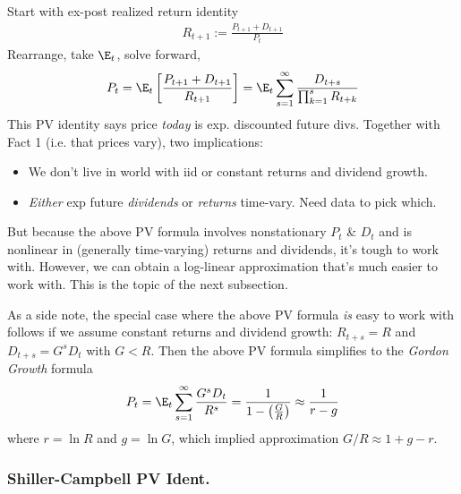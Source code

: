 \documentclass[12pt]{article}
\theoremstyle{plain}
\theoremstyle{definition}
\theoremstyle{remark}
\begin{document}
\begin{multicols*}{2}
Start with ex-post realized return identity
\begin{align}
  R_{t+1}
  :=
  \frac{P_{t+1}+D_{t+1}}{P_t}
  \label{expostrealizedreturns}
\end{align}
Rearrange, take $\E_t$, solve forward,
\begin{align*}
  P_{t}
  = \E_t\left[\frac{P_{t+1}+D_{t+1}}{R_{t+1}}\right]
  =
  \E_t\sum_{s=1}^\infty
  \frac{D_{t+s}}{\prod_{k=1}^s R_{t+k}}
\end{align*}
This PV identity says price \emph{today} is exp. discounted future divs.
Together with Fact 1 (i.e. that prices vary), two implications:
\begin{itemize}
  \item We don't live in world with iid or constant returns and dividend
    growth.
  \item
    \emph{Either} exp future \emph{dividends} or \emph{returns}
    time-vary. Need data to pick which.
\end{itemize}
But because the above PV formula involves nonstationary $P_t$ \& $D_t$
and is nonlinear in (generally time-varying) returns and dividends, it's
tough to work with. However, we can obtain a log-linear approximation
that's much easier to work with. This is the topic of the next
subsection.

As a side note, the special case where the above PV formula \emph{is}
easy to work with follows if we assume constant returns and dividend
growth: $R_{t+s}=R$ and $D_{t+s}=G^sD_t$ with $G<R$. Then the above PV
formula simplifies to the \emph{Gordon Growth} formula
\begin{align*}
  P_{t}
  =
  \E_t\sum_{s=1}^\infty
  \frac{G^sD_{t}}{R^s}
  =
  \frac{1}{1-\left(\frac{G}{R}\right)}
  \approx
  \frac{1}{r-g}
\end{align*}
where $r=\ln R$ and $g=\ln G$, which implied approximation
$G/R\approx 1+g-r$.



\columnbreak
\subsubsection{Shiller-Campbell PV Ident.}


\end{multicols*}
\end{document}
